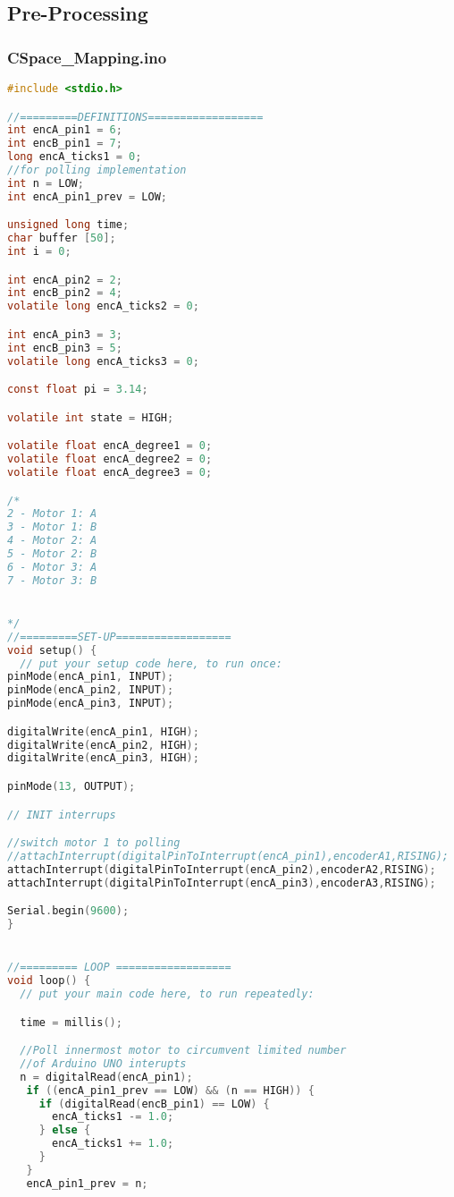 \subsection{Pre-Processing}
\subsubsection{CSpace\_Mapping.ino}
\begin{lstlisting}[language=C]
#include <stdio.h>

//=========DEFINITIONS==================
int encA_pin1 = 6;
int encB_pin1 = 7;
long encA_ticks1 = 0;
//for polling implementation
int n = LOW;
int encA_pin1_prev = LOW;

unsigned long time;
char buffer [50];
int i = 0;

int encA_pin2 = 2;
int encB_pin2 = 4;
volatile long encA_ticks2 = 0;

int encA_pin3 = 3;
int encB_pin3 = 5;
volatile long encA_ticks3 = 0;

const float pi = 3.14;

volatile int state = HIGH;

volatile float encA_degree1 = 0;
volatile float encA_degree2 = 0;
volatile float encA_degree3 = 0;

/*
2 - Motor 1: A
3 - Motor 1: B
4 - Motor 2: A
5 - Motor 2: B
6 - Motor 3: A
7 - Motor 3: B


*/
//=========SET-UP==================
void setup() {
  // put your setup code here, to run once:
pinMode(encA_pin1, INPUT);
pinMode(encA_pin2, INPUT);
pinMode(encA_pin3, INPUT);

digitalWrite(encA_pin1, HIGH);
digitalWrite(encA_pin2, HIGH);
digitalWrite(encA_pin3, HIGH);

pinMode(13, OUTPUT);

// INIT interrups

//switch motor 1 to polling
//attachInterrupt(digitalPinToInterrupt(encA_pin1),encoderA1,RISING);
attachInterrupt(digitalPinToInterrupt(encA_pin2),encoderA2,RISING);
attachInterrupt(digitalPinToInterrupt(encA_pin3),encoderA3,RISING);

Serial.begin(9600);
}


//========= LOOP ==================
void loop() {
  // put your main code here, to run repeatedly:

  time = millis();

  //Poll innermost motor to circumvent limited number
  //of Arduino UNO interupts
  n = digitalRead(encA_pin1);
   if ((encA_pin1_prev == LOW) && (n == HIGH)) {
     if (digitalRead(encB_pin1) == LOW) {
       encA_ticks1 -= 1.0;
     } else {
       encA_ticks1 += 1.0;
     }
   } 
   encA_pin1_prev = n;


\end{lstlisting}
